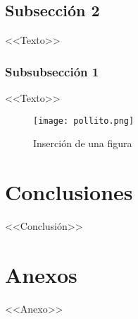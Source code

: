 \begin{multicols}{2}

\subsection{Subsección 2}

<<Texto>>

\subsubsection{Subsubsección 1}

<<Texto>>

\begin{figure}[H]
    \centering
    \texttt{[image: pollito.png]}
    \caption{Inserción de una figura}
    \label{figura}
\end{figure}

\section{Conclusiones}

<<Conclusión>>

\printbibliography

\end{multicols}

\section{Anexos}

<<Anexo>>

